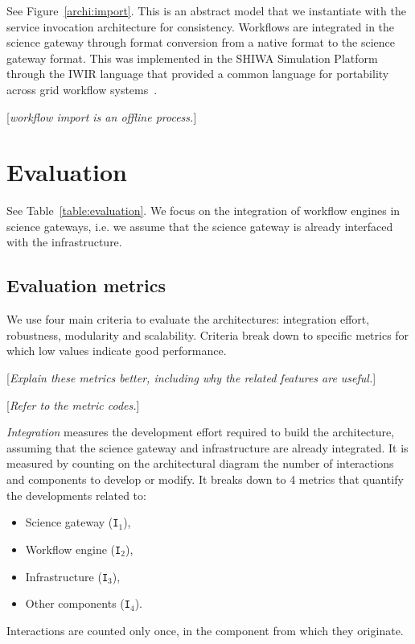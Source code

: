 \documentclass[preprint,3p,twocolumn]{elsarticle}
\newcommand{\todo}[1]{\color{blue}\xspace[\emph{#1}]\xspace\color{black}}
\begin{document}
See Figure~\ref{archi:import}. This is an abstract model that we
instantiate with the service invocation architecture for
consistency. Workflows are integrated in the science gateway through
format conversion from a native format to the science gateway
format. This was implemented in the SHIWA Simulation Platform through
the IWIR language that provided a common language for portability
across grid workflow
systems~\cite{plankensteiner-prodan-etal:2013}.

\todo{workflow import is an offline process.}

\section{Evaluation}

See Table~\ref{table:evaluation}. We focus on the integration of
workflow engines in science gateways, i.e. we assume that the science
gateway is already interfaced with the infrastructure.

\subsection{Evaluation metrics}

We use four main criteria to evaluate the architectures: integration
effort, robustness, modularity and scalability. Criteria break down to
specific metrics for which low values indicate good performance.

\todo{Explain these metrics better, including why the related features
  are useful.}

\todo{Refer to the metric codes.}

\emph{Integration} measures the development effort required to build
the architecture, assuming that the science gateway and infrastructure
are already integrated. It is measured by counting on the
architectural diagram the number of interactions and components to
develop or modify. It breaks down to 4 metrics that quantify the
developments related to:
\begin{itemize}[itemsep=0cm]
\item Science gateway (\texttt{I$_1$}),
\item Workflow engine (\texttt{I$_2$}),
\item Infrastructure (\texttt{I$_3$}),
\item Other components (\texttt{I$_4$}).
\end{itemize}
Interactions are counted only once, in the component from which they
originate.
\end{document}
